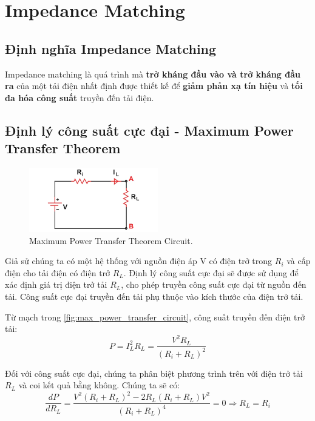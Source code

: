 \chapter{Impedance Matching}
    \section{Định nghĩa Impedance Matching}
        Impedance matching là quá trình mà \textbf{trở kháng đầu vào và trở kháng đầu ra} 
        của một tải điện nhất định được thiết kế để \textbf{giảm phản xạ tín hiệu} và 
        \textbf{tối đa hóa công suất} truyền đến tải điện.\cite{allaboutcircuits_impedance}
    
    \section{Định lý công suất cực đại - Maximum Power Transfer Theorem}
        \begin{figure}[h]
            \centering
            \includegraphics[width=0.5\textwidth]{figures/max_power_transfer_circuit.png}
            \caption{Maximum Power Transfer Theorem Circuit.}
            \label{fig:max_power_transfer_circuit}
        \end{figure}

        Giả sử chúng ta có một hệ thống với nguồn điện áp V có điện trở trong $R_i$ và cấp điện cho tải điện có điện trở $R_L$. 
        Định lý công suất cực đại sẽ được sử dụng để xác định giá trị điện trở tải $R_L$, 
        cho phép truyền công suất cực đại từ nguồn đến tải. 
        Công suất cực đại truyền đến tải phụ thuộc vào kích thước của điện trở tải.\par

        Từ mạch trong \autoref{fig:max_power_transfer_circuit}, công suất truyền đến điện trở tải:
        \begin{equation}
            P = I_L^2 R_L = \frac{V^2 R_L}{(R_i + R_L)^2}
        \end{equation}

        Đối với công suất cực đại, chúng ta phân biệt phương trình trên với điện trở tải $R_L$ và coi kết quả bằng không. 
        Chúng ta sẽ có:
        \begin{equation}
            \frac{dP}{dR_L} = \frac{V^2 (R_i + R_L)^2 - 2R_L (R_i + R_L) V^2}{(R_i + R_L)^4} = 0 \Rightarrow R_L = R_i
        \end{equation}

